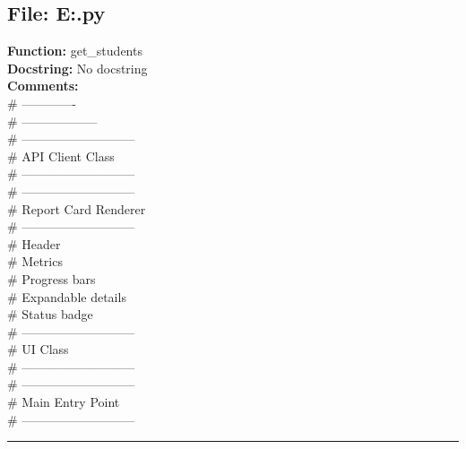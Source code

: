 {\subsection*{File: E:\project\capstone\frontend\view.py}
\textbf{Function:} get_students\\
\textbf{Docstring:} No docstring\\
\textbf{Comments:}\\
# -------------\\
# ------------------\\
# ---------------------------\\
# API Client Class\\
# ---------------------------\\
# ---------------------------\\
# Report Card Renderer\\
# ---------------------------\\
# Header\\
# Metrics\\
# Progress bars\\
# Expandable details\\
# Status badge\\
# ---------------------------\\
# UI Class\\
# ---------------------------\\
# ---------------------------\\
# Main Entry Point\\
# ---------------------------\\

\hrule

}
